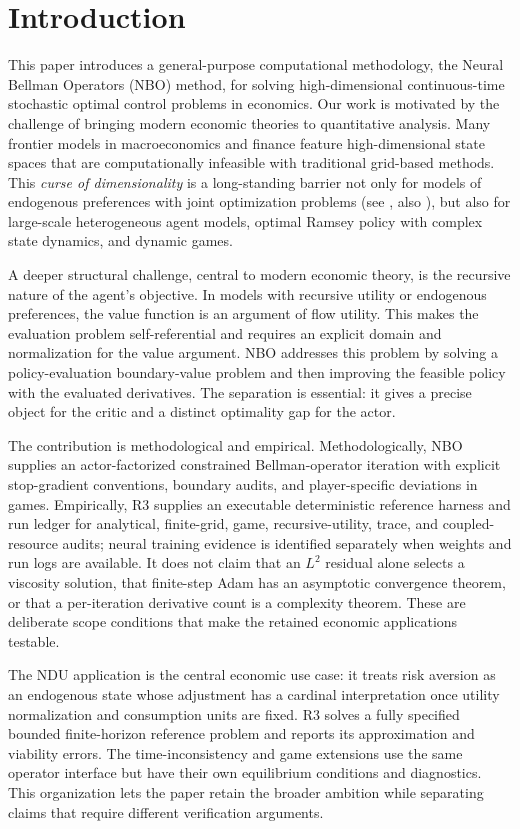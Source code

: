 \documentclass[ecta]{econsocart}
\theoremstyle{plain}
\theoremstyle{remark}
\begin{document}
\section{Introduction}

This paper introduces a general-purpose computational methodology, the Neural Bellman Operators (NBO) method, for solving high-dimensional continuous-time stochastic optimal control problems in economics. Our work is motivated by the challenge of bringing modern economic theories to quantitative analysis. Many frontier models in macroeconomics and finance feature high-dimensional state spaces that are computationally infeasible with traditional grid-based methods. This \textit{curse of dimensionality} is a long-standing barrier not only for models of endogenous preferences with joint optimization problems (see , also \cite{qi2025}), but also for large-scale heterogeneous agent models, optimal Ramsey policy with complex state dynamics, and dynamic games.


A deeper structural challenge, central to modern economic theory, is the recursive nature of the agent's objective. In models with recursive utility or endogenous preferences, the value function is an argument of flow utility. This makes the evaluation problem self-referential and requires an explicit domain and normalization for the value argument. NBO addresses this problem by solving a policy-evaluation boundary-value problem and then improving the feasible policy with the evaluated derivatives. The separation is essential: it gives a precise object for the critic and a distinct optimality gap for the actor.

The contribution is methodological and empirical. Methodologically, NBO supplies an actor-factorized constrained Bellman-operator iteration with explicit stop-gradient conventions, boundary audits, and player-specific deviations in games. Empirically, R3 supplies an executable deterministic reference harness and run ledger for analytical, finite-grid, game, recursive-utility, trace, and coupled-resource audits; neural training evidence is identified separately when weights and run logs are available. It does not claim that an $L^2$ residual alone selects a viscosity solution, that finite-step Adam has an asymptotic convergence theorem, or that a per-iteration derivative count is a complexity theorem. These are deliberate scope conditions that make the retained economic applications testable.

The NDU application is the central economic use case: it treats risk aversion as an endogenous state whose adjustment has a cardinal interpretation once utility normalization and consumption units are fixed. R3 solves a fully specified bounded finite-horizon reference problem and reports its approximation and viability errors. The time-inconsistency and game extensions use the same operator interface but have their own equilibrium conditions and diagnostics. This organization lets the paper retain the broader ambition while separating claims that require different verification arguments.
\end{document}
